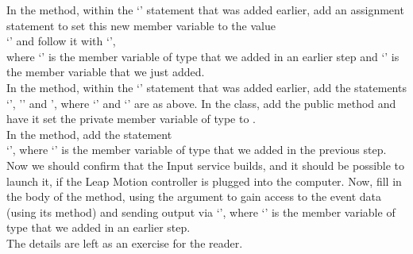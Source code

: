 In the  method, within the `'
statement that was added earlier, add an assignment statement to set this new member
variable to the value\\
`' and
follow it with `',\\
where `' is the member variable of type  that we
added in an earlier step and `' is the member variable that we just added.\\

In the  method, within the `'
statement that was added earlier, add the statements
`', '' and ',
where `' and `' are as above.
\tertiaryEnd{}
In the  class, add the public method
 and have it set the private member variable of type
 to .\\

In the  method, add the statement\\
`', where `' is the member variable of type
 that we added in the previous step.\\

Now we should confirm that the Input service builds, and it should be possible to launch
it, if the Leap Motion controller is plugged into the computer.
\tertiaryEnd{}
Now, fill in the body of the  method, using the
 argument to gain access to the event data (using its
 method) and sending output via `', where
`' is the member variable of type  that we
added in an earlier step.\\

The details are left as an exercise for the reader.
\tertiaryEnd{}
\secondaryEnd{}
\appendixEnd{}
